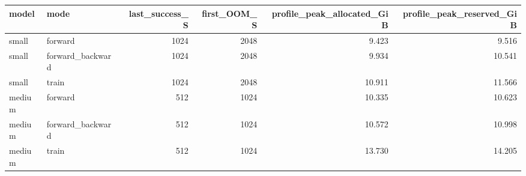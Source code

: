 \begin{tabular}{llrrrr}
\toprule
model & mode & last\_success\_S & first\_OOM\_S & profile\_peak\_allocated\_GiB & profile\_peak\_reserved\_GiB \\
\midrule
small & forward & 1024 & 2048 & 9.423 & 9.516 \\
small & forward\_backward & 1024 & 2048 & 9.934 & 10.541 \\
small & train & 1024 & 2048 & 10.911 & 11.566 \\
medium & forward & 512 & 1024 & 10.335 & 10.623 \\
medium & forward\_backward & 512 & 1024 & 10.572 & 10.998 \\
medium & train & 512 & 1024 & 13.730 & 14.205 \\
\bottomrule
\end{tabular}
